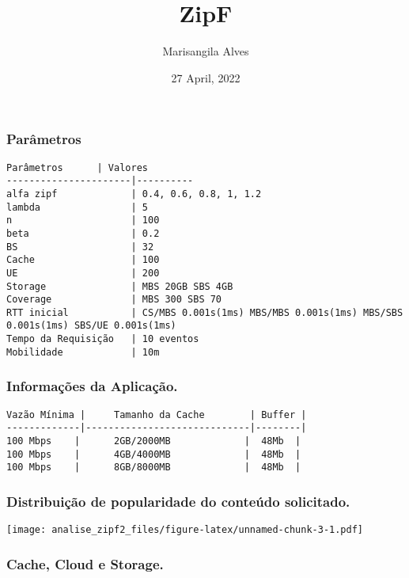 \documentclass[
]{article}
\title{ZipF}
\author{Marisangila Alves}
\date{27 April, 2022}
\begin{document}
\maketitle

\hypertarget{paruxe2metros}{%
\subsubsection{Parâmetros}\label{paruxe2metros}}

\begin{verbatim}
Parâmetros      | Valores
----------------------|----------
alfa zipf             | 0.4, 0.6, 0.8, 1, 1.2 
lambda                | 5
n                     | 100
beta                  | 0.2
BS                    | 32
Cache                 | 100
UE                    | 200
Storage               | MBS 20GB SBS 4GB
Coverage              | MBS 300 SBS 70
RTT inicial           | CS/MBS 0.001s(1ms) MBS/MBS 0.001s(1ms) MBS/SBS 0.001s(1ms) SBS/UE 0.001s(1ms)
Tempo da Requisição   | 10 eventos
Mobilidade            | 10m
\end{verbatim}

\hypertarget{informauxe7uxf5es-da-aplicauxe7uxe3o.}{%
\subsubsection{Informações da
Aplicação.}\label{informauxe7uxf5es-da-aplicauxe7uxe3o.}}

\begin{verbatim}
Vazão Mínima |     Tamanho da Cache        | Buffer |
-------------|-----------------------------|--------|
100 Mbps    |      2GB/2000MB             |  48Mb  |
100 Mbps    |      4GB/4000MB             |  48Mb  |
100 Mbps    |      8GB/8000MB             |  48Mb  |
\end{verbatim}

\hypertarget{distribuiuxe7uxe3o-de-popularidade-do-conteuxfado-solicitado.}{%
\subsubsection{Distribuição de popularidade do conteúdo
solicitado.}\label{distribuiuxe7uxe3o-de-popularidade-do-conteuxfado-solicitado.}}

\texttt{[image: analise\_zipf2\_files/figure-latex/unnamed-chunk-3-1.pdf]}

\hypertarget{cache-cloud-e-storage.}{%
\subsubsection{Cache, Cloud e Storage.}\label{cache-cloud-e-storage.}}
\end{document}
